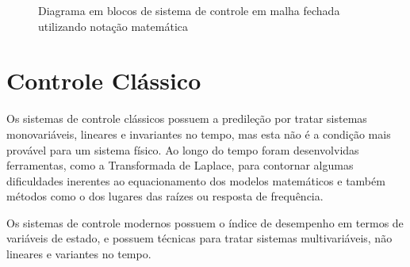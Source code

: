 \begin{figure}[!htb]
\centering
{}
\caption{ Diagrama em blocos de sistema de controle em malha fechada utilizando notação matemática}
\label{fig:malhaFechadaLetras}
\end{figure}



\section{Controle Clássico}

Os sistemas de controle clássicos possuem a predileção por tratar sistemas monovariáveis, lineares e invariantes no tempo, mas esta não é a condição mais provável para um sistema físico. Ao longo do tempo foram desenvolvidas ferramentas, como a Transformada de Laplace, para contornar algumas dificuldades inerentes ao equacionamento dos modelos matemáticos e também métodos como o dos lugares das raízes ou resposta de frequência.

Os sistemas de controle modernos possuem o índice de desempenho em termos de variáveis de estado, e possuem técnicas para tratar sistemas multivariáveis, não lineares e variantes no tempo.

